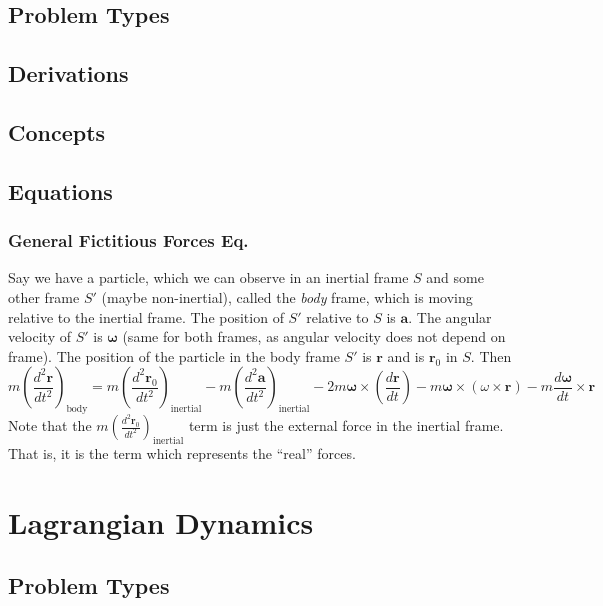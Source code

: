 \documentclass[25pt]{book}
\begin{document}
	\section{Problem Types}
	
	\section{Derivations}
	
	\section{Concepts}
	
	\section{Equations}
	
	\subsection{General Fictitious Forces Eq.}
	
	Say we have a particle, which we can observe in an inertial frame $S$ and some other frame $S'$ (maybe non-inertial), called the \textit{body} frame, which is moving relative to the inertial frame. The position of $S'$ relative to $S$ is $\textbf{a}$. The angular velocity of $S'$ is $\bm{\omega}$ (same for both frames, as angular velocity does not depend on frame). The position of the particle in the body frame $S'$ is $\textbf{r}$ and is $\textbf{r}_0$ in $S$. Then
	\[
	m \left( \frac{d^2 \textbf{r}}{dt^2} \right)_{\text{body}} = m \left( \frac{d^2 \textbf{r}_0}{dt^2} \right)_{\text{inertial}}
	- m \left( \frac{d^2 \textbf{a}}{dt^2} \right)_{\text{inertial}} - 2 m \bm{\omega} \times \left( \frac{d \textbf{r}}{dt} \right) - m \bm{\omega} \times \left( \omega \times \textbf{r} \right) - m \frac{d\bm{\omega}}{dt} \times \textbf{r}
	\]
	Note that the $m \left( \frac{d^2 \textbf{r}_0}{dt^2} \right)_{\text{inertial}}$ term is just the external force in the inertial frame. That is, it is the term which represents the ``real'' forces. 
	
	\chapter{Lagrangian Dynamics}
	
	\section{Problem Types}
	
\end{document}
